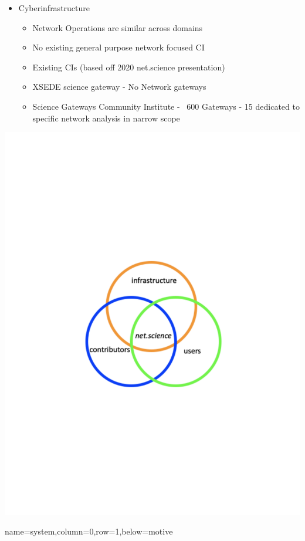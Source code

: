 \documentclass[landscape,paperwidth=70in,paperheight=46in,fontscale=0.225]{baposter} %
\begin{document}
\begin{poster}
{{\begin{minipage}{.6\textwidth}
\begin{itemize}[leftmargin=*,noitemsep,topsep=0pt]
\item Cyberinfrastructure
	\begin{itemize}
	\item Network Operations are similar across domains
	\item No existing general purpose network focused CI
	\item Existing CIs (based off 2020 net.science presentation)
	\item XSEDE science gateway - No Network gateways
	\item Science Gateways Community Institute - ~600 Gateways - 15 dedicated to specific network analysis in narrow scope
	\end{itemize}
\end{itemize}
\end{minipage}
\hfill
\begin{minipage}{.3\textwidth}
\begin{center}
   \includegraphics[scale=0.25]{figures/motivation.pdf}
   \end{center}
\end{minipage}
}}
          {name=system,column=0,row=1,below=motive}{

}
\end{poster}
\end{document}
